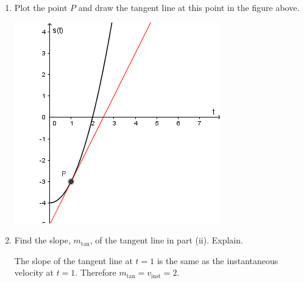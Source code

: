 \documentclass[nooutcomes,handout]{ximera}
\begin{document}
\begin{problem}
\begin{enumerate}
\begin{enumerate}
\item
Plot the point $P$ and draw the tangent line at this point in the figure above.
\begin{freeResponse} \hfil
\begin{image}
\includegraphics[scale = .7]{Figure11.png}
\end{image}
\end{freeResponse}


\item
Find the slope, $m_{\mathrm{tan}}$, of the tangent line in part (ii).
Explain.
\begin{freeResponse}
The slope of the tangent line at $t = 1$ is the same as the instantaneous velocity at $t = 1$.
Therefore $m_{\mathrm{tan}} = v_{\mathrm{inst}} = 2$.
\end{freeResponse}
\end{enumerate}


\end{enumerate}
\end{problem} 
	
	
	
	
	
	
	

	










								
				
				
	
\end{document}
